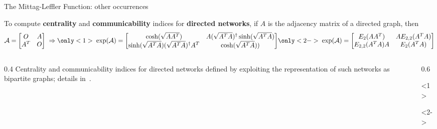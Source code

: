 \documentclass[aspectratio=169,xcolor=dvipsnames]{beamer}
\begin{document}
\begin{frame}{The Mittag-Leffler Function: other occurrences}

To compute \textbf{centrality} and \textbf{communicability} indices for \textbf{directed networks}, if $A$ is the \alert{adjacency matrix of a directed graph}, then
\[
\mathcal{A} = \begin{bmatrix}
O & A \\
A^T & O
\end{bmatrix} \; \Rightarrow \only<1>{\; \exp(\mathcal{A}) = \begin{bmatrix}
\cosh(\sqrt{AA^T}) & A(\sqrt{A^TA})^\dagger\sinh(\sqrt{A^TA}) \\
\sinh(\sqrt{A^TA})(\sqrt{A^TA})^\dagger A^T & \cosh(\sqrt{A^TA})) 
\end{bmatrix}}\only<2->{
\; \exp(\mathcal{A}) = \begin{bmatrix}
E_2(AA^T) & A E_{2,2}(A^TA)\\
E_{2,2}(A^TA) A & E_2(A^TA) 
\end{bmatrix}
}
\]
\begin{columns}
\begin{column}{0.4\columnwidth}
Centrality and communicability indices for \alert<1>{directed networks} defined
by exploiting the representation of such networks as \alert{bipartite graphs}; details in~\parencite{MR3005305}.
\end{column}
\begin{column}{0.6\columnwidth}
\begin{onlyenv}<1>
\begin{center}
\end{center}
\end{onlyenv}
\begin{onlyenv}<2->
\begin{center}
\end{center}
\end{onlyenv}
\end{column}
\end{columns}

\end{frame}
\end{document}

